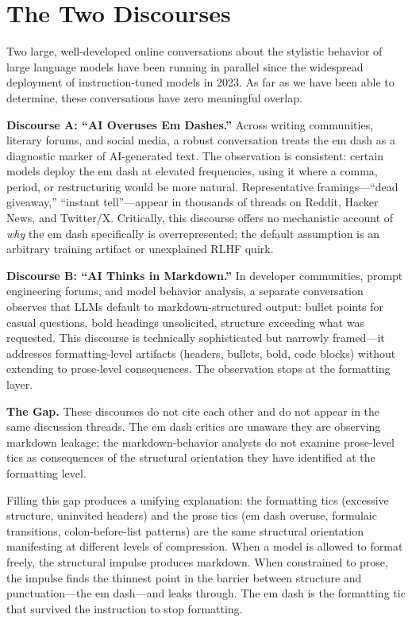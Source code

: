 \section{The Two Discourses}
\label{sec:discourses}

Two large, well-developed online conversations about the stylistic behavior of large language models have been running in parallel since the widespread deployment of instruction-tuned models in 2023. As far as we have been able to determine, these conversations have zero meaningful overlap.

\textbf{Discourse A: ``AI Overuses Em Dashes.''} Across writing communities, literary forums, and social media, a robust conversation treats the em dash as a diagnostic marker of AI-generated text. The observation is consistent: certain models deploy the em dash at elevated frequencies, using it where a comma, period, or restructuring would be more natural. Representative framings---``dead giveaway,'' ``instant tell''---appear in thousands of threads on Reddit, Hacker News, and Twitter/X. Critically, this discourse offers no mechanistic account of \textit{why} the em dash specifically is overrepresented; the default assumption is an arbitrary training artifact or unexplained RLHF quirk.

\textbf{Discourse B: ``AI Thinks in Markdown.''} In developer communities, prompt engineering forums, and model behavior analysis, a separate conversation observes that LLMs default to markdown-structured output: bullet points for casual questions, bold headings unsolicited, structure exceeding what was requested. This discourse is technically sophisticated but narrowly framed---it addresses formatting-level artifacts (headers, bullets, bold, code blocks) without extending to prose-level consequences. The observation stops at the formatting layer.

\textbf{The Gap.} These discourses do not cite each other and do not appear in the same discussion threads. The em dash critics are unaware they are observing markdown leakage; the markdown-behavior analysts do not examine prose-level tics as consequences of the structural orientation they have identified at the formatting level.

Filling this gap produces a unifying explanation: the formatting tics (excessive structure, uninvited headers) and the prose tics (em dash overuse, formulaic transitions, colon-before-list patterns) are the same structural orientation manifesting at different levels of compression. When a model is allowed to format freely, the structural impulse produces markdown. When constrained to prose, the impulse finds the thinnest point in the barrier between structure and punctuation---the em dash---and leaks through. The em dash is the formatting tic that survived the instruction to stop formatting.
